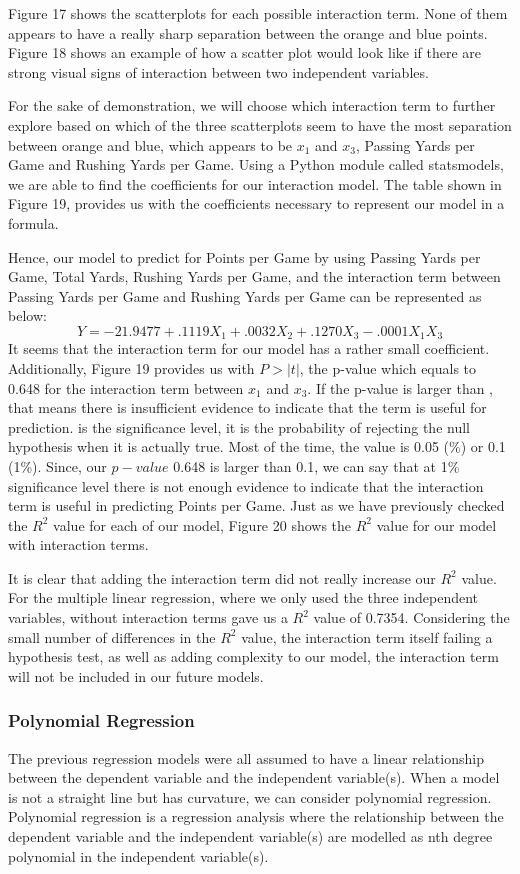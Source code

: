 \documentclass[a4paper,12pt]{report}
\begin{document}
Figure 17 shows the scatterplots for each possible interaction term. None of them appears to have a really sharp separation between the orange and blue points. Figure 18 shows an example of how a scatter plot would look like if there are strong visual signs of interaction between two independent variables.

For the sake of demonstration, we will choose which interaction term to further explore based on which of the three scatterplots seem to have the most separation between orange and blue, which appears to be $x_1$ and $x_3$, Passing Yards per Game and Rushing Yards per Game. Using a Python module called statsmodels, we are able to find the coefficients for our interaction model. The table shown in Figure 19, provides us with the coefficients necessary to represent our model in a formula.

Hence, our model to predict for Points per Game by using Passing Yards per Game, Total Yards, Rushing Yards per Game, and the interaction term between Passing Yards per Game and Rushing Yards per Game can be represented as below:
$$Y=-21.9477+.1119X_1+.0032X_2+.1270X_3-.0001X_1X_3$$
It seems that the interaction term for our model has a rather small coefficient. Additionally, Figure 19 provides us with $P>|t|$, the p-value which equals to 0.648 for the interaction term between $x_1$ and $x_3$. If the p-value is larger than , that means there is insufficient evidence to indicate that the term is useful for prediction.  is the significance level, it is the probability of rejecting the null hypothesis when it is actually true. Most of the time, the  value is 0.05 (\%) or 0.1 (1\%). Since, our $p-value$ 0.648 is larger than 0.1, we can say that at 1\% significance level there is not enough evidence to indicate that the interaction term is useful in predicting Points per Game. Just as we have previously checked the $R^2$  value for each of our model, Figure 20 shows the $R^2$ value for our model with interaction terms.

It is clear that adding the interaction term did not really increase our $R^2$ value. For the multiple linear regression, where we only used the three independent variables, without interaction terms gave us a $R^2$ value of 0.7354. Considering the small number of differences in the $R^2$ value, the interaction term itself failing a hypothesis test, as well as adding complexity to our model, the interaction term will not be included in our future models.

\subsubsection{Polynomial Regression}
The previous regression models were all assumed to have a linear relationship between the dependent variable and the independent variable(s). When a model is not a straight line but has curvature, we can consider polynomial regression. Polynomial regression is a regression analysis where the relationship between the dependent variable and the independent variable(s) are modelled as nth degree polynomial in the independent variable(s).
 
\end{document}

